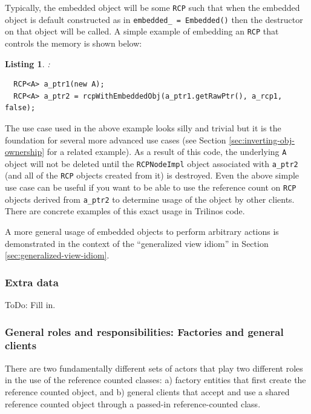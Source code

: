 \documentclass[pdf,ps2pdf,11pt]{SANDreport}
\newtheorem{listing}{Listing}
\begin{document}
Typically, the embedded object will be some {}\texttt{RCP} such that
when the embedded object is default constructed as in
{}\texttt{embedded\_ = Embedded()} then the destructor on that object
will be called.  A simple example of embedding an {}\texttt{RCP} that
controls the memory is shown below:

\begin{listing}: \\
{\small\begin{verbatim}
  RCP<A> a_ptr1(new A);
  RCP<A> a_ptr2 = rcpWithEmbeddedObj(a_ptr1.getRawPtr(), a_rcp1, false);
\end{verbatim}}
\end{listing}

The use case used in the above example looks silly and trivial but it
is the foundation for several more advanced use cases (see Section
{}\ref{sec:inverting-obj-ownership} for a related example).  As a
result of this code, the underlying {}\texttt{A} object will not be
deleted until the {}\texttt{RCPNodeImpl} object associated with
{}\texttt{a\_ptr2} (and all of the {}\texttt{RCP} objects created from
it) is destroyed.  Even the above simple use case can be useful if you
want to be able to use the reference count on {}\texttt{RCP} objects
derived from {}\texttt{a\_ptr2} to determine usage of the object by
other clients.  There are concrete examples of this exact usage in
Trilinos code.

A more general usage of embedded objects to perform arbitrary actions
is demonstrated in the context of the ``generalized view idiom'' in
Section {}\ref{sec:generalized-view-idiom}.


%
{}\subsubsection{Extra data}
\label{sec:extra-data}
%

ToDo: Fill in.


%
{}\subsubsection{General roles and responsibilities: Factories and
general clients}
%

There are two fundamentally different sets of actors that play two
different roles in the use of the reference counted classes: a)
factory entities that first create the reference counted object, and
b) general clients that accept and use a shared reference counted
object through a passed-in reference-counted class.
\end{document}
